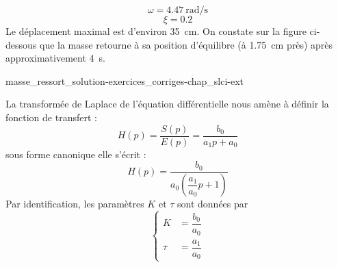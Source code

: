 \[
    \omega=\SI{4.47}{\radian\per\second}
\]
\[
    \xi=0.2
\]
Le déplacement maximal est d'environ \SI{35}{\centi\meter}. On 
constate sur la figure ci-dessous que la masse retourne 
à sa position d'équilibre (à \SI{1.75}{\centi\meter} près) après 
approximativement \SI{4}{\second}.
\begin{center}
    {masse_ressort_solution-exercices_corriges-chap_slci-ext}
    
\end{center}
La transformée de Laplace de l'équation différentielle nous amène à définir
la fonction de transfert :
\[
    H(p)= \dfrac{S(p)}{E(p)}=\dfrac{b_0}{a_1p+a_0}
\]
sous forme canonique elle s'écrit :
\[
    H(p)=\dfrac{b_0}{a_0\left(\dfrac{a_1}{a_0}p+1\right)}
\]
Par identification, les paramètres $K$ et $\tau$ sont données par 
\[
    \begin{cases}
        K&=\dfrac{b_0}{a_0}\\[1.5em]
     \tau&=\dfrac{a_1}{a_0}
    \end{cases}
\]
